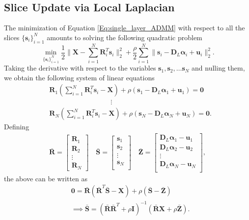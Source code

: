 \documentclass[10pt,twocolumn,letterpaper]{article}
\def\Xb{{\mathbf{\bar{S}}}}
\def\Rb{{\mathbf{\bar{R}}}}
\def\Zb{{\mathbf{\bar{Z}}}}
\def\s{{\mathbf s}}
\def\X{{\mathbf X}}
\def\u{ \mathbf{u}}
\def\u{{\mathbf u}}
\def\D{{\mathbf D}}
\def\R{{\mathbf R}}
\def\alfa{{\boldsymbol \alpha}}
\begin{document}
\subsection{Slice Update via Local Laplacian} \label{Subsection:slice_update}
The minimization of Equation \eqref{Eq:single_layer_ADMM} with respect to all the slices $\{ \s_i \}_{i=1}^N$ amounts to solving the following quadratic problem
\begin{equation}
	\min_{ \{ \s_i \}_{i=1}^N } \frac{1}{2} \| \X - \sum_{i=1}^N \R_i^T \s_i \|_2^2 + \frac{\rho}{2} \sum_{i=1}^N \| \s_i - \D_L \alfa_i + \u_i \|_2^2.
\end{equation}
Taking the derivative with respect to the variables $\s_1, \s_2, \dots \s_N$ and nulling them, we obtain the following system of linear equations
\begin{align}
	& \R_1 ( \sum_{i=1}^N \R_i^T \s_i - \X ) + \rho (\s_1 - \D_L \alfa_1 + \u_1) = \mathbf{0} \\
	& \phantom{................................} \vdots \\
	& \R_N ( \sum_{i=1}^N \R_i^T \s_i - \X ) + \rho (\s_N - \D_L \alfa_N + \u_N) = \mathbf{0}.
\end{align}
Defining
\begin{align}
	\Rb =
	\begin{bmatrix}
		\R_1 \\
		\R_2 \\
		\vdots \\
		\R_N
	\end{bmatrix}
	\quad
	\Xb = \begin{bmatrix}
		\s_1 \\
		\s_2 \\
		\vdots \\
		\s_N \\
	\end{bmatrix}
	\quad
	\Zb =
	\begin{bmatrix}
		\D_L \alfa_1 - \u_1 \\
		\D_L \alfa_2 - \u_2 \\
		\vdots \\
		\D_L \alfa_N - \u_N \\
	\end{bmatrix},
\end{align}
the above can be written as
\begin{align}
	& \mathbf{0} = \Rb \left( \Rb^T \Xb - \X \right) + \rho \left( \Xb - \Zb \right) \\
	& \implies \Xb = \left( \Rb \Rb^T  + \rho \mathbf{I} \right)^{-1} \left( \Rb \X + \rho \Zb \right).
\end{align}
\end{document}
